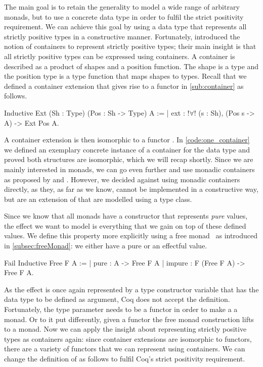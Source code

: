 The main goal is to retain the generality to model a wide range of arbitrary monads, but to use a concrete data type in order to fulfil the strict positivity requirement.
We can achieve this goal by using a data type that represents all strictly positive types in a constructive manner.
Fortunately, \citet{abbott2003categories} introduced the notion of containers to represent strictly positive types; their main insight is that all strictly positive types can be expressed using containers.
A container is described as a product of shapes and a position function.
The shape is a type  and the position type  is a type function that maps shapes to types.
Recall that we defined a container extension that gives rise to a functor in \autoref{sub:container} as follows.

\begin{coqcode}
Inductive Ext (Sh : Type) (Pos : Sh -> Type) A :=
| ext : !$\forall$! (s : Sh), (Pos s -> A) -> Ext Pos A.
\end{coqcode}

A container extension  is then isomorphic to a functor .
In \autoref{code:one_container} we defined an exemplary concrete instance of a container for the data type  and proved both structures are isomorphic, which we will recap shortly.
Since we are mainly interested in monads, we can go even further and use monadic containers as proposed by \citet{altenkirch2017monadic} and \citet{uustalu2017partiality}.
However, we decided against using monadic containers directly, as they, as far as we know, cannot be implemented in a constructive way, but are an extension of  that are modelled using a type class.

Since we know that all monads have a constructor that represents \emph{pure} values, the effect we want to model is everything that we gain on top of these defined values.
We define this property more explicitly using a free monad~\citep{swierstra2008data} as introduced in \autoref{subsec:freeMonad}: we either have a pure or an effectful value.

\begin{coqcode}
Fail Inductive Free F A :=
| pure   : A -> Free F A
| impure : F (Free F A) -> Free F A.
\end{coqcode}

As the effect is once again represented by a type constructor variable  that has the data type to be defined as argument, Coq does not accept the definition.
Fortunately, the type parameter  needs to be a functor in order to make a  a monad.
Or to it put differently, given a functor  the free monad construction lifts  to a monad.
Now we can apply the insight about representing strictly positive types as containers again: since container extensions are isomorphic to functors, there are a variety of functors that we can represent using containers.
We can change the definition of  as follows to fulfil Coq's strict positivity requirement.

